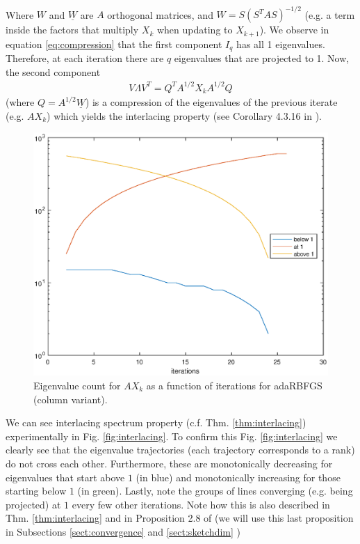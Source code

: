 \documentclass[12pt,conference,compsocconf]{IEEEtran}
\begin{document}
\\
Where $W$ and $\underline{W}$ are $A$ orthogonal matrices, and $W=S(S^TAS)^{-1/2}$ (e.g. a term inside the factors that multiply $X_k$ when updating to $X_{k+1}$).
We observe in equation \eqref{eq:compression} that the first component $I_q$ has all 1 eigenvalues. Therefore, at each iteration there are $q$ eigenvalues that are projected to 1. Now, the second component 
\begin{align}\label{eq:compression2}
	V\Lambda V^T=Q^TA^{1/2}X_kA^{1/2}Q 
\end{align}
(where $Q=A^{1/2}\underline{W}$) is a compression of the eigenvalues of the previous iterate (e.g. $AX_{k}$) which yields the interlacing property (see Corollary 4.3.16 in \cite{Horn}).\\
\begin{figure}
  \centering
  \includegraphics[height=0.7\columnwidth,width=1.0\columnwidth]{eigvalcountiter.eps}
  
  \vspace{-2mm}
  \caption{Eigenvalue count for $AX_k$ as a function of iterations for adaRBFGS (column variant). \label{fig:eigcount}}  
  
\end{figure}
We can see interlacing spectrum property (c.f. Thm. \ref{thm:interlacing}) experimentally in Fig. \ref{fig:interlacing}. To confirm this Fig. \ref{fig:interlacing} we clearly see that the eigenvalue trajectories (each trajectory corresponds to a rank) do not cross each other. Furthermore, these are monotonically decreasing for eigenvalues that start above $1$ (in blue) and monotonically increasing for those starting below $1$ (in green). Lastly, note the groups of lines converging (e.g. being projected) at $1$ every few other iterations. Note how this is also described in Thm. \ref{thm:interlacing} and in Proposition 2.8 of \cite{Gratton} (we will use this last proposition in Subsections \ref{sect:convergence}  and \ref{sect:sketchdim} )
\end{document}
